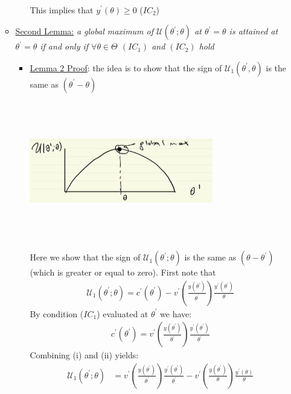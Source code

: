 \documentclass{article}
\begin{document}
\begin{itemize}
\begin{itemize}
\begin{itemize}
\begin{align*}
            \end{align*}
            This implies that $y^{'}(\theta) \geq 0$ ($IC_{2}$)
        \end{itemize}
        \item \underline{Second Lemma:} \textit{ a global maximum of $\mathcal{U}(\theta^{'}; \theta)$ at $\theta^{'} = \theta$ is attained at $\theta^{'} = \theta$ if and only if $\forall \theta \in \Theta$ $(IC_{1})$ and $(IC_{2})$ hold}
        \begin{itemize}
            \item \underline{Lemma 2 Proof}: the idea is to show that the sign of $\mathcal{U}_{1}(\theta^{'}, \theta)$ is the same as $(\theta^{'} - \theta)$
            \newline
            \begin{center}
                \includegraphics[width=8cm, height=6cm]{pic29}
            \end{center}
            Here we show that the sign of $\mathcal{U}_{1}(\theta^{'};\theta)$ is the same as $(\theta - \theta^{'})$ (which is greater or equal to zero). First note that
            \begin{gather*}
                \mathcal{U}_{1}(\theta^{'}; \theta) = c^{'}(\theta^{'}) - v^{'}(\frac{y(\theta^{'})}{\theta^{'}})\frac{y^{'}(\theta^{'})}{\theta} \tag{i}
            \end{gather*}
            By condition ($IC_{1}$) evaluated at $\theta^{'}$ we have:
            \begin{gather*}
                c^{'}(\theta^{'}) = v^{'}(\frac{y(\theta^{'})}{\theta^{'}})\frac{y^{'}(\theta^{'})}{\theta^{'}} \tag{ii}
            \end{gather*}
            Combining (i) and (ii) yields:
            \begin{align*}
                \mathcal{U}_{1}(\theta^{'}; \theta) &= v^{'}(\frac{y(\theta^{'})}{\theta^{'}})\frac{y^{'}(\theta^{'})}{\theta^{'}} - v^{'}(\frac{y(\theta^{'})}{\theta})\frac{y^{'}(\theta)}{\theta} \\

\end{align*}
\end{itemize}
\end{itemize}
\end{itemize}
\end{document}
